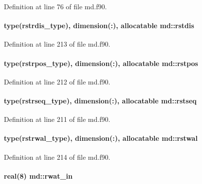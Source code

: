 Definition at line 76 of file md.\-f90.

\hypertarget{classmd_a51772d14e966c59e1f91116fa44e1392}{
\paragraph[{rstdis}]{\setlength{\rightskip}{0pt plus 5cm}type({\bf rstrdis\-\_\-type}), dimension(\-:), allocatable md\-::rstdis}}\label{classmd_a51772d14e966c59e1f91116fa44e1392}


Definition at line 213 of file md.\-f90.

\hypertarget{classmd_ae0a036f0b9b98601315ed9fc7642fee8}{
\paragraph[{rstpos}]{\setlength{\rightskip}{0pt plus 5cm}type({\bf rstrpos\-\_\-type}), dimension(\-:), allocatable md\-::rstpos}}\label{classmd_ae0a036f0b9b98601315ed9fc7642fee8}


Definition at line 212 of file md.\-f90.

\hypertarget{classmd_af183580e84d3f1773acdc46fc83db654}{
\paragraph[{rstseq}]{\setlength{\rightskip}{0pt plus 5cm}type({\bf rstrseq\-\_\-type}), dimension(\-:), allocatable md\-::rstseq}}\label{classmd_af183580e84d3f1773acdc46fc83db654}


Definition at line 211 of file md.\-f90.

\hypertarget{classmd_a63f220f467d396d46266866a09312ee0}{
\paragraph[{rstwal}]{\setlength{\rightskip}{0pt plus 5cm}type({\bf rstrwal\-\_\-type}), dimension(\-:), allocatable md\-::rstwal}}\label{classmd_a63f220f467d396d46266866a09312ee0}


Definition at line 214 of file md.\-f90.

\hypertarget{classmd_a021a8fe94b77593045a45d33c3c352c6}{
\paragraph[{rwat\-\_\-in}]{\setlength{\rightskip}{0pt plus 5cm}real(8) md\-::rwat\-\_\-in}}\label{classmd_a021a8fe94b77593045a45d33c3c352c6}


